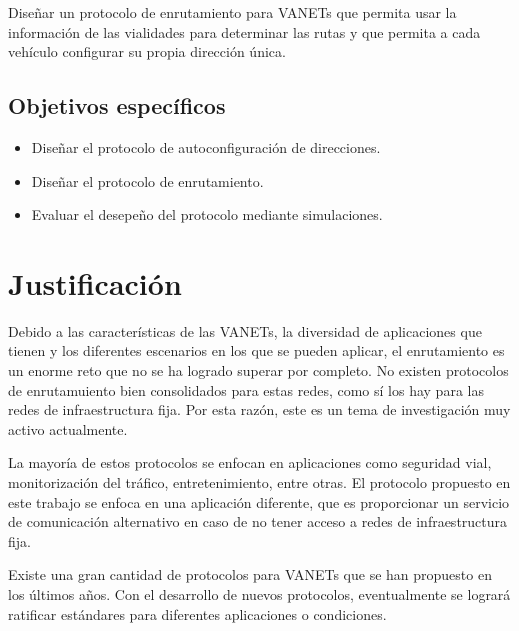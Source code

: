 Diseñar un protocolo de enrutamiento para VANETs que permita usar la información
de las vialidades para determinar las rutas y que permita a cada vehículo
configurar su propia dirección única.

\subsection{Objetivos específicos}
\label{subsec:objetivos_especificos}

\begin{itemize}
  \item Diseñar el protocolo de autoconfiguración de direcciones.
  \item Diseñar el protocolo de enrutamiento.
  \item Evaluar el desepeño del protocolo mediante simulaciones.
\end{itemize}

\section{Justificación}
\label{sec:justificacion}

Debido a las características de las VANETs, la diversidad de aplicaciones que
tienen y los diferentes escenarios en los que se pueden aplicar, el enrutamiento
es un enorme reto que no se ha logrado superar por completo. No existen
protocolos de enrutamuiento bien consolidados para estas redes, como sí los hay
para las redes de infraestructura fija. Por esta razón, este es un tema de
investigación muy activo actualmente.

La mayoría de estos protocolos se enfocan en aplicaciones como seguridad vial,
monitorización del tráfico, entretenimiento, entre otras. El protocolo
propuesto en este trabajo se enfoca en una aplicación diferente, que es
proporcionar un servicio de comunicación alternativo en caso de no tener acceso
a redes de infraestructura fija.

Existe una gran cantidad de protocolos para VANETs que se han propuesto en los
últimos años. Con el desarrollo de nuevos protocolos, eventualmente se
logrará ratificar estándares para diferentes aplicaciones o condiciones.
